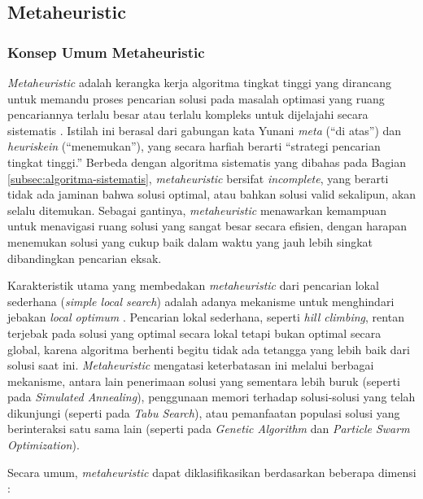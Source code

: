 \subsection{Metaheuristic}
\label{subsec:metaheuristic}

\subsubsection{Konsep Umum Metaheuristic}
\label{subsubsec:metaheuristic-konsep}

\textit{Metaheuristic} adalah kerangka kerja algoritma tingkat tinggi yang dirancang untuk memandu proses pencarian solusi pada masalah optimasi yang ruang pencariannya terlalu besar atau terlalu kompleks untuk dijelajahi secara sistematis \cite{blum2003metaheuristics}. Istilah ini berasal dari gabungan kata Yunani \textit{meta} (``di atas'') dan \textit{heuriskein} (``menemukan''), yang secara harfiah berarti ``strategi pencarian tingkat tinggi.'' Berbeda dengan algoritma sistematis yang dibahas pada Bagian \ref{subsec:algoritma-sistematis}, \textit{metaheuristic} bersifat \textit{incomplete}, yang berarti tidak ada jaminan bahwa solusi optimal, atau bahkan solusi valid sekalipun, akan selalu ditemukan. Sebagai gantinya, \textit{metaheuristic} menawarkan kemampuan untuk menavigasi ruang solusi yang sangat besar secara efisien, dengan harapan menemukan solusi yang cukup baik dalam waktu yang jauh lebih singkat dibandingkan pencarian eksak.

Karakteristik utama yang membedakan \textit{metaheuristic} dari pencarian lokal sederhana (\textit{simple local search}) adalah adanya mekanisme untuk menghindari jebakan \textit{local optimum} \cite{blum2003metaheuristics}. Pencarian lokal sederhana, seperti \textit{hill climbing}, rentan terjebak pada solusi yang optimal secara lokal tetapi bukan optimal secara global, karena algoritma berhenti begitu tidak ada tetangga yang lebih baik dari solusi saat ini. \textit{Metaheuristic} mengatasi keterbatasan ini melalui berbagai mekanisme, antara lain penerimaan solusi yang sementara lebih buruk (seperti pada \textit{Simulated Annealing}), penggunaan memori terhadap solusi-solusi yang telah dikunjungi (seperti pada \textit{Tabu Search}), atau pemanfaatan populasi solusi yang berinteraksi satu sama lain (seperti pada \textit{Genetic Algorithm} dan \textit{Particle Swarm Optimization}).

Secara umum, \textit{metaheuristic} dapat diklasifikasikan berdasarkan beberapa dimensi \cite{blum2003metaheuristics}:

